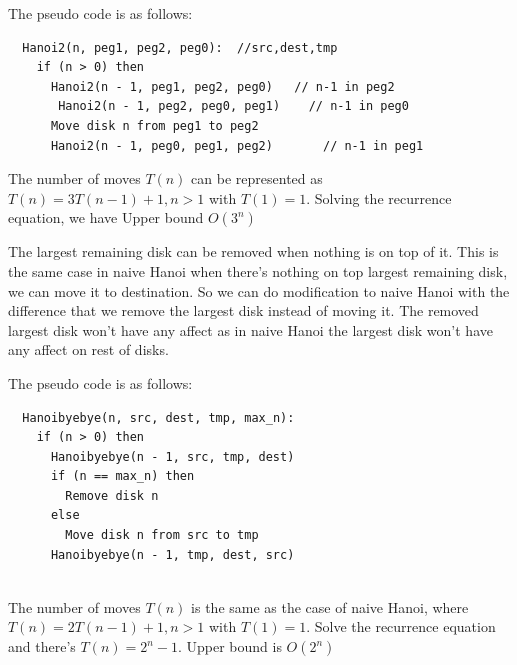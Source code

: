 \documentclass[12pt,a4paper]{article}
\newcommand{\question}[1]{\bigskip\noindent{\textbf{Q{#1} solution}}}
\begin{document}
The pseudo code is as follows:

\begin{lstlisting}
  Hanoi2(n, peg1, peg2, peg0):  //src,dest,tmp
    if (n > 0) then
      Hanoi2(n - 1, peg1, peg2, peg0)  	// n-1 in peg2
	   Hanoi2(n - 1, peg2, peg0, peg1)	  // n-1 in peg0
      Move disk n from peg1 to peg2
      Hanoi2(n - 1, peg0, peg1, peg2)		// n-1 in peg1
\end{lstlisting}

The number of moves $T(n)$ can be represented as $T(n) = 3T(n - 1) + 1, n > 1$ with $T(1) = 1$. Solving the recurrence equation, we have Upper bound $O(3^n)$


\question{13.C}

The largest remaining disk can be removed when nothing is on top of it. This is the same case in naive Hanoi when there's nothing on top largest remaining disk, we can move it to destination. So we can do modification to naive Hanoi with the difference that we remove the largest disk instead of moving it. The removed largest disk won't have any affect as in naive Hanoi the largest disk won't have any affect on rest of disks.

The pseudo code is as follows:
\begin{lstlisting}
  Hanoibyebye(n, src, dest, tmp, max_n):
    if (n > 0) then
      Hanoibyebye(n - 1, src, tmp, dest)
      if (n == max_n) then
        Remove disk n
      else
        Move disk n from src to tmp
      Hanoibyebye(n - 1, tmp, dest, src)
  
\end{lstlisting}

The number of moves $T(n)$ is the same as the case of naive Hanoi, where $T(n) = 2T(n - 1) + 1, n > 1$ with $T(1) = 1$. Solve the recurrence equation and there's $T(n) = 2^n - 1$. Upper bound is $O(2^n)$
\end{document}
